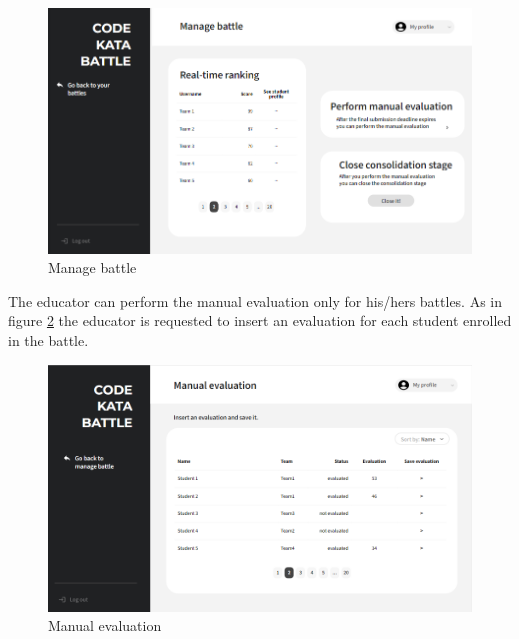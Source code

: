 \begin{figure}[h]
    \centering
    \includegraphics[width=\textwidth]{images/mockups/educators/ManageBattle.png}
    \caption{Manage battle}
    \label{fig:manageB}
\end{figure}

The educator can perform the manual evaluation only for his/hers battles. As in figure \ref{fig:evalM} the educator is requested to insert an evaluation for each student enrolled in the battle.
\begin{figure}[h]
    \centering
    \includegraphics[width=\textwidth]{images/mockups/educators/evalM.png}
    \caption{Manual evaluation}
    \label{fig:evalM}
\end{figure}

\clearpage
